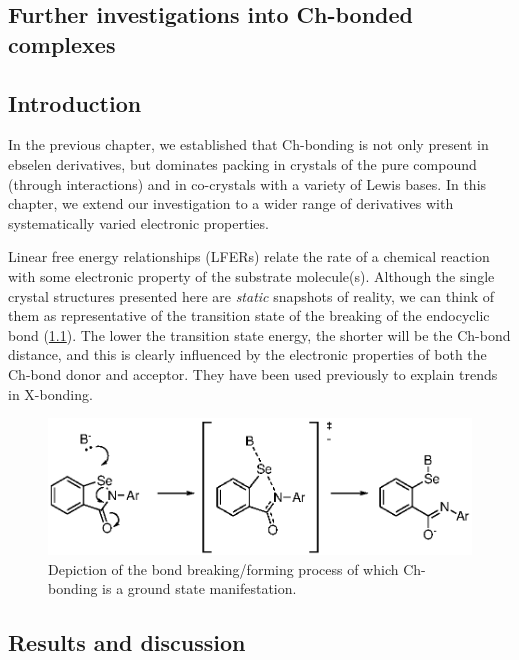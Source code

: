 \begin{refsection}

\chapter{Further investigations into Ch-bonded complexes}

\section{Introduction}
In the previous chapter, we established that Ch-bonding is not only present in ebselen derivatives, but dominates packing in crystals of the pure compound (through  interactions) and in co-crystals with a variety of Lewis bases.
In this chapter, we extend our investigation to a wider range of derivatives with systematically varied electronic properties.

Linear free energy relationships (LFERs) relate the rate of a chemical reaction with some electronic property of the substrate molecule(s).
Although the single crystal structures presented here are \emph{static} snapshots of reality, we can think of them as representative of the transition state of the breaking of the endocyclic  bond (\cref{fig:bond-breaking}).
The lower the transition state energy, the shorter will be the  Ch-bond distance, and this is clearly influenced by the electronic properties of both the Ch-bond donor and acceptor.
They have been used previously to explain trends in X-bonding.\autocite{Laurence1983,Sarwar2010}

\begin{figure}
  \includegraphics[scale=0.74]{Figures/bond-breaking.eps}
  \caption[Nucleophilic substitution at selenium.]{Depiction of the bond breaking/forming process of which Ch-bonding is a ground state manifestation.}\label{fig:bond-breaking}
\end{figure}

\section{Results and discussion}


\end{refsection}

